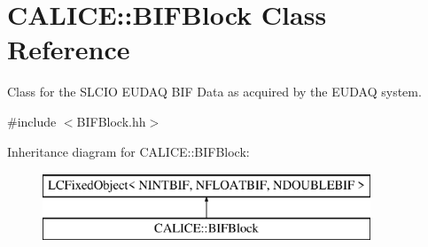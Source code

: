 \section{C\-A\-L\-I\-C\-E\-:\-:B\-I\-F\-Block Class Reference}
\label{classCALICE_1_1BIFBlock}


Class for the S\-L\-C\-I\-O E\-U\-D\-A\-Q B\-I\-F Data as acquired by the E\-U\-D\-A\-Q system.  




{\ttfamily \#include $<$B\-I\-F\-Block.\-hh$>$}

Inheritance diagram for C\-A\-L\-I\-C\-E\-:\-:B\-I\-F\-Block\-:\begin{figure}[H]
\begin{center}
\leavevmode
\includegraphics[height=2.000000cm]{classCALICE_1_1BIFBlock}
\end{center}
\end{figure}
